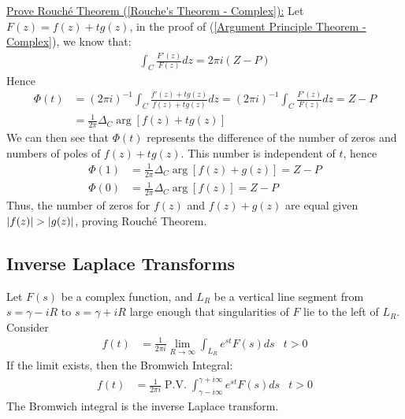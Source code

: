\documentclass[12pt, english]{book}
\makeatletter
\renewenvironment{proof}[1][\proofname]{\par
	\pushQED{\qed}%
	\normalfont \topsep6\p@\@plus6\p@\relax
	\list{}{%
		\settowidth{\leftmargin}{\itshape\proofname:\hskip\labelsep}%
		\setlength{\labelwidth}{0pt}%
		\setlength{\itemindent}{-\leftmargin}%
		}%
	\item[\hskip\labelsep\itshape#1\@addpunct{:}]\ignorespaces
	}{\popQED\endlist\@endpefalse}
\makeatother
\begin{document}
\begin{example}
\begin{proof}
{			\underline{Prove Rouché Theorem (\cref{Rouche's Theorem - Complex}):} \newline
			Let \(F(z) = f(z) + tg(z)\), in the proof of (\cref{Argument Principle Theorem - Complex}), we know that:
			\begin{align*}
				\int_{C} \frac{F'(z)}{F(z)} dz = 2\pi i(Z-P)
			\end{align*}
			Hence
			\begin{align*}
				\Phi(t) 
				&= (2\pi i)^{-1} \int_{C} \frac{f'(z) + tg(z)}{f(z) + tg(z)} dz = (2\pi i)^{-1} \int_{C} \frac{F'(z)}{F(z)} dz = Z-P \\
				&= \frac{1}{2\pi} \Delta_{C} \arg[f(z) + tg(z)]
			\end{align*}
			We can then see that \(\Phi(t)\) represents the difference of the number of zeros and numbers of poles of \(f(z) + tg(z)\). This number is independent of \(t\), hence
			\begin{align*}
				\Phi(1) &= \frac{1}{2\pi} \Delta_{C} \arg[f(z) + g(z)] = Z-P \\
				\Phi(0) &= \frac{1}{2\pi} \Delta_{C} \arg[f(z)] = Z-P
			\end{align*}
			Thus, the number of zeros for \(f(z)\) and \(f(z) + g(z)\) are equal given \(\abs{f(z)} > \abs{g(z)}\), proving Rouché Theorem.
			}
		\end{proof}
	\end{example}

	\subsection{Inverse Laplace Transforms} \label{Inverse Laplace Transforms Subsection - Complex}
	
	\begin{definition}
		\label{Bromwich Integral Definition - Complex}
		Let \(F(s)\) be a complex function, and \(L_R\) be a vertical line segment from \(s = \gamma - iR\) to \(s = \gamma + iR\) large enough that singularities of \(F\) lie to the left of \(L_R\). Consider 
		\begin{align*}
			f(t) &= \frac{1}{2\pi i} \lim_{R \rightarrow \infty} \int_{L_R} e^{st} F(s) ds 
			& t>0
		\end{align*}
		If the limit exists, then the Bromwich Integral:
		\begin{align*}
			f(t) &= \frac{1}{2\pi i} \operatorname{P.V.} \int_{\gamma - i\infty}^{\gamma + i\infty} e^{st} F(s) ds 
				& t>0
		\end{align*}
		The Bromwich integral is the inverse Laplace transform.
	\end{definition}
	
\end{document}
